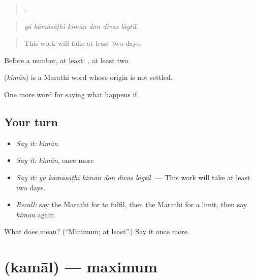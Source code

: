 \begin{quote}
     .
\end{quote}

\begin{quote}
\emph{yā kāmāsāṭhī kimān don divas lāgtīl.}
\end{quote}

\begin{quote}
This work will take at least two days.
\end{quote}

Before a number, at least:  , at least two.

\begin{cousinweb}
\textbf{} (\emph{kimān}) is a Marathi word whose origin is not settled.
\end{cousinweb}

\begin{grammarlens}[title={What you've built}]
One more word for saying what happens if.
\end{grammarlens}

\subsection*{Your turn}
\begin{itemize}
\raggedright
  \item \emph{Say it:} \emph{kimān}
  \item \emph{Say it:} \emph{kimān}, once more
  \item \emph{Say it:} \emph{yā kāmāsāṭhī kimān don divas lāgtīl.} — This work will take at least two days.
  \item \emph{Recall:} say the Marathi for to fulfil, then the Marathi for a limit, then say \emph{kimān} again
\end{itemize}

\begin{tcolorbox}[breakable,colback=teal!4,colframe=teal!35!black,title={Before you move on}]
What does  mean? (\textquotedblleft{}Minimum; at least\textquotedblright{}.) Say it once more.
\end{tcolorbox}
\section[\texorpdfstring{\mr{कमाल} (kamāl)}{कमाल (kamāl)}]{ (kamāl) — maximum}

\label{lesson:MR-C379-kamal}



